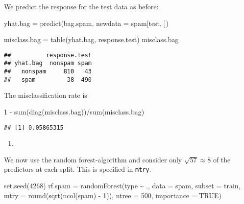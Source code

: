 \documentclass[
]{article}
\newenvironment{Shaded}{\begin{snugshade}}{\end{snugshade}}
\newcommand{\AttributeTok}[1]{\textcolor[rgb]{0.77,0.63,0.00}{#1}}
\newcommand{\ConstantTok}[1]{\textcolor[rgb]{0.00,0.00,0.00}{#1}}
\newcommand{\DecValTok}[1]{\textcolor[rgb]{0.00,0.00,0.81}{#1}}
\newcommand{\FunctionTok}[1]{\textcolor[rgb]{0.00,0.00,0.00}{#1}}
\newcommand{\NormalTok}[1]{#1}
\newcommand{\OtherTok}[1]{\textcolor[rgb]{0.56,0.35,0.01}{#1}}
\newcommand{\SpecialCharTok}[1]{\textcolor[rgb]{0.00,0.00,0.00}{#1}}
\providecommand{\tightlist}{%
  \setlength{\itemsep}{0pt}\setlength{\parskip}{0pt}}
\begin{document}
We predict the response for the test data as before:

\begin{Shaded}
\begin{Highlighting}[]
\NormalTok{yhat.bag }\OtherTok{=} \FunctionTok{predict}\NormalTok{(bag.spam, }\AttributeTok{newdata =}\NormalTok{ spam[test, ])}

\NormalTok{misclass.bag }\OtherTok{=} \FunctionTok{table}\NormalTok{(yhat.bag, response.test)}
\NormalTok{misclass.bag}
\end{Highlighting}
\end{Shaded}

\begin{verbatim}
##          response.test
## yhat.bag  nonspam spam
##   nonspam     810   43
##   spam         38  490
\end{verbatim}

The misclassification rate is

\begin{Shaded}
\begin{Highlighting}[]
\DecValTok{1} \SpecialCharTok{{-}} \FunctionTok{sum}\NormalTok{(}\FunctionTok{diag}\NormalTok{(misclass.bag))}\SpecialCharTok{/}\FunctionTok{sum}\NormalTok{(misclass.bag)}
\end{Highlighting}
\end{Shaded}

\begin{verbatim}
## [1] 0.05865315
\end{verbatim}

\begin{enumerate}
\def\labelenumi{\alph{enumi})}
\setcounter{enumi}{6}
\tightlist
\item
\end{enumerate}

We now use the random forest-algorithm and consider only
\(\sqrt{57}\approx 8\) of the predictors at each split. This is
specified in \texttt{mtry}.

\begin{Shaded}
\begin{Highlighting}[]
\FunctionTok{set.seed}\NormalTok{(}\DecValTok{4268}\NormalTok{)}
\NormalTok{rf.spam }\OtherTok{=} \FunctionTok{randomForest}\NormalTok{(type }\SpecialCharTok{\textasciitilde{}}\NormalTok{ ., }\AttributeTok{data =}\NormalTok{ spam, }\AttributeTok{subset =}\NormalTok{ train, }\AttributeTok{mtry =} \FunctionTok{round}\NormalTok{(}\FunctionTok{sqrt}\NormalTok{(}\FunctionTok{ncol}\NormalTok{(spam) }\SpecialCharTok{{-}}
    \DecValTok{1}\NormalTok{)), }\AttributeTok{ntree =} \DecValTok{500}\NormalTok{, }\AttributeTok{importance =} \ConstantTok{TRUE}\NormalTok{)}
\end{Highlighting}
\end{Shaded}
\end{document}
